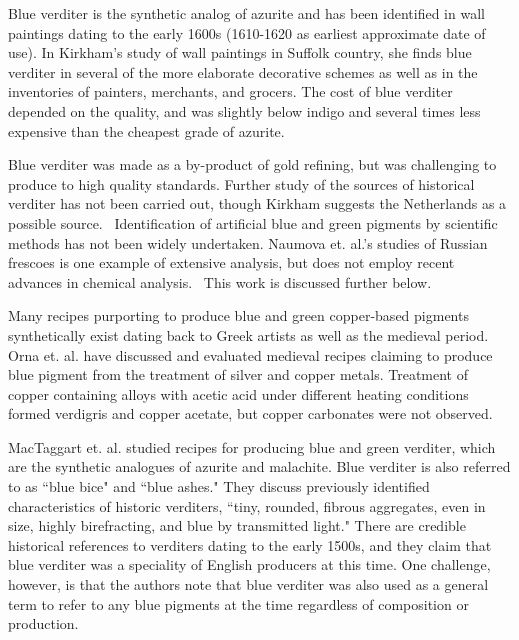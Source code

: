 Blue verditer is the synthetic analog of azurite and has been identified in wall paintings dating to the early 1600s (1610-1620 as earliest approximate date of use). In Kirkham's study of wall paintings in Suffolk country, she finds blue verditer in several of the more elaborate decorative schemes as well as in the inventories of painters, merchants, and grocers. The cost of blue verditer depended on the quality, and was slightly below indigo and several times less expensive than the cheapest grade of azurite.~\autocite{Kirkham_thesis} 

Blue verditer was made as a by-product of gold refining, but was challenging to produce to high quality standards. Further study of the sources of historical verditer has not been carried out, though Kirkham suggests the Netherlands as a possible source.~\autocite{Kirkham_thesis,Kirby} Identification of artificial blue and green pigments by scientific methods has not been widely undertaken. Naumova et. al.'s studies of Russian frescoes is one example of extensive analysis, but does not employ recent advances in chemical analysis.~\autocite{Naumova1994,Naumova1990} This work is discussed further below.

Many recipes purporting to produce blue and green copper-based pigments synthetically exist dating back to Greek artists as well as the medieval period.~\autocite{mappae_clavicula,Orna_literature,Orna_silver,Barnett} Orna et. al. have discussed and evaluated medieval recipes claiming to produce blue pigment from the treatment of silver and copper metals. Treatment of copper containing alloys with acetic acid under different heating conditions formed verdigris and copper acetate, but copper carbonates were not observed.~\autocite{Orna_literature,Orna_silver}

MacTaggart et. al. studied recipes for producing blue and green verditer, which are the synthetic analogues of azurite and malachite. Blue verditer is also referred to as ``blue bice" and ``blue ashes." They discuss previously identified characteristics of historic verditers, ``tiny, rounded, fibrous aggregates, even in size, highly birefracting, and blue by transmitted light." There are credible historical references to verditers dating to the early 1500s, and they claim that blue verditer was a speciality of English producers at this time. One challenge, however, is that the authors note that blue verditer was also used as a general term to refer to any blue pigments at the time regardless of composition or production. 

